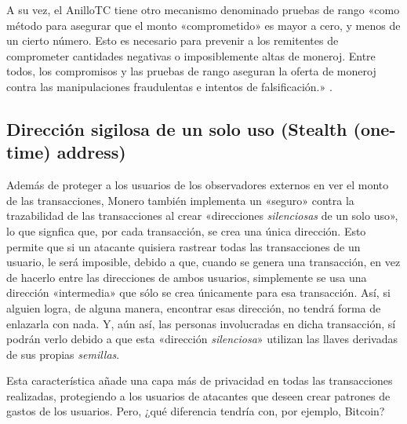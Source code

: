 \documentclass[12pt,a4paper,twoside]{book}
\begin{document}
A su vez, el AnilloTC tiene otro mecanismo denominado pruebas de rango «como método para asegurar que el monto «comprometido» es mayor a cero, y menos de un cierto número. Esto es necesario para prevenir a los remitentes de comprometer cantidades negativas o imposiblemente altas de moneroj. Entre todos, los compromisos y las pruebas de rango aseguran la oferta de moneroj contra las manipulaciones fraudulentas e intentos de falsificación.» \cite[págs. 62]{monero:master}.

\subsection{Dirección sigilosa de un solo uso (Stealth (one-time) address)}
Además de proteger a los usuarios de los observadores externos en ver el monto de las transacciones, Monero también implementa un «seguro» contra la trazabilidad de las transacciones al crear «direcciones \textit{silenciosas} de un solo uso», lo que signfica que, por cada transacción, se crea una única dirección. Esto permite que si un atacante quisiera rastrear todas las transacciones de un usuario, le será imposible, debido a que, cuando se genera una transacción, en vez de hacerlo entre las direcciones de ambos usuarios, simplemente se usa una dirección «intermedia» que sólo se crea únicamente para esa transacción. Así, si alguien logra, de alguna manera, encontrar esas dirección, no tendrá forma de enlazarla con nada. Y, aún así, las personas involucradas en dicha transacción, sí podrán verlo debido a que esta «dirección \textit{silenciosa}» utilizan las llaves derivadas de sus propias \textit{semillas}.

Esta característica añade una capa más de privacidad en todas las transacciones realizadas, protegiendo a los usuarios de atacantes que deseen crear patrones de gastos de los usuarios. Pero, ¿qué diferencia tendría con, por ejemplo, Bitcoin?
\end{document}
